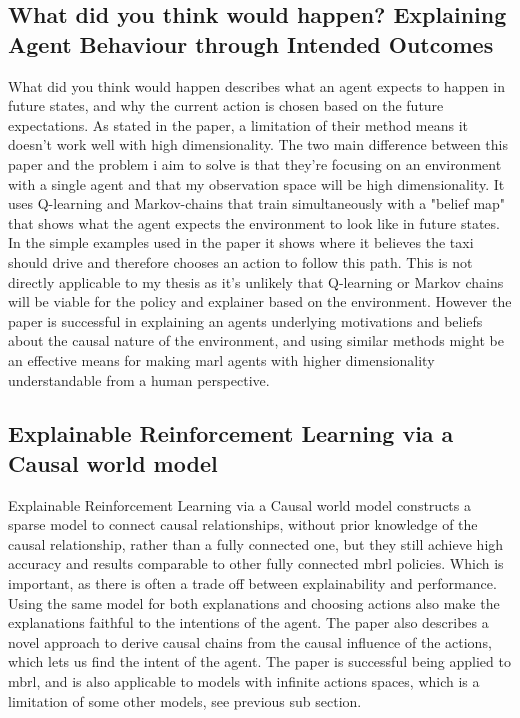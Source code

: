 \documentclass[UKenglish]{uiomasterthesis}
\begin{document}
\subsection{What did you think would happen? Explaining Agent Behaviour through Intended Outcomes}
What did you think would happen describes what an agent expects to happen in future states, and why the current action is chosen based on the future expectations. As stated in the paper, a limitation of their method means it doesn't work well with high dimensionality. The two main difference between this paper and the problem i aim to solve is that they're focusing on an environment with a single agent and that my observation space will be high dimensionality. It uses Q-learning and Markov-chains that train simultaneously with a "belief map" that shows what the agent expects the environment to look like in future states. In the simple examples used in the paper it shows where it believes the taxi should drive and therefore chooses an action to follow this path. This is not directly applicable to my thesis as it's unlikely that Q-learning or Markov chains will be viable for the policy and explainer based on the environment. However the paper is successful in explaining an agents underlying motivations and beliefs about the causal nature of the environment, and using similar methods might be an effective means for making \ac{marl} agents with higher dimensionality understandable from a human perspective. 

\subsection{Explainable Reinforcement Learning via a Causal world model}
Explainable Reinforcement Learning via a Causal world model constructs a sparse model to connect causal relationships, without prior knowledge of the causal relationship, rather than a fully connected one, but they still achieve high accuracy and results comparable to other fully connected \ac{mbrl} policies. Which is important, as there is often a trade off between explainability and performance. Using the same model for both explanations and choosing actions also make the explanations faithful to the intentions of the agent. The paper also describes a novel approach to derive causal chains from the causal influence of the actions, which lets us find the intent of the agent. The paper is successful being applied to \ac{mbrl}, and is also applicable to models with infinite actions spaces, which is a limitation of some other models, see previous sub section.
\end{document}
